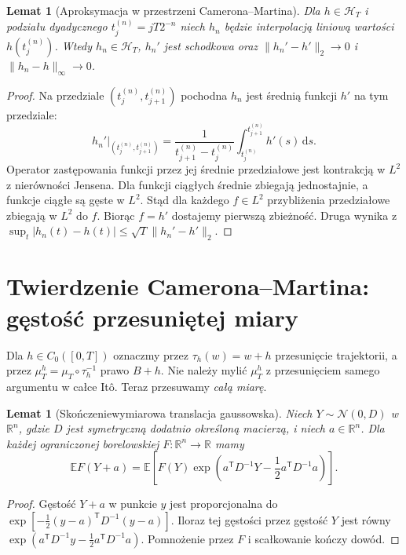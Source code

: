\documentclass[11pt,a4paper,oneside]{report}
\numberwithin{equation}{chapter}
\theoremstyle{plain}
\newtheorem{lemat}[twierdzenie]{Lemat}
\theoremstyle{definition}
\theoremstyle{remark}
\newcommand{\R}{\mathbb{R}}
\newcommand{\E}{\mathbb{E}}
\newcommand{\calH}{\mathcal{H}}
\newcommand{\dd}{\mathrm{d}}
\newcommand{\Normal}{\mathcal{N}}
\begin{document}
\begin{lemat}[Aproksymacja w przestrzeni Camerona--Martina]\label{lem:volIII:09:01}
\label{lem:cm-approx}
Dla $h\in\calH_T$ i podziału dyadycznego
$t_j^{(n)}=jT2^{-n}$ niech $h_n$ będzie interpolacją liniową
wartości $h(t_j^{(n)})$. Wtedy $h_n\in\calH_T$,
$h_n'$ jest schodkowa oraz
$\|h_n'-h'\|_2\to0$ i $\|h_n-h\|_\infty\to0$.
\end{lemat}
\begin{proof}
Na przedziale $(t_j^{(n)},t_{j+1}^{(n)})$ pochodna $h_n$
jest średnią funkcji $h'$ na tym przedziale:
\[
 h_n'|_{(t_j^{(n)},t_{j+1}^{(n)})}
 =\frac{1}{t_{j+1}^{(n)}-t_j^{(n)}}
 \int_{t_j^{(n)}}^{t_{j+1}^{(n)}}h'(s)\,\dd s.
\]
Operator zastępowania funkcji przez jej średnie przedziałowe
jest kontrakcją w $L^2$ z nierówności Jensena.
Dla funkcji ciągłych średnie zbiegają jednostajnie,
a funkcje ciągłe są gęste w $L^2$. Stąd dla każdego
$f\in L^2$ przybliżenia przedziałowe zbiegają w $L^2$ do $f$.
Biorąc $f=h'$ dostajemy pierwszą zbieżność. Druga wynika
z $\sup_t|h_n(t)-h(t)|\le\sqrt T\|h_n'-h'\|_2$.
\end{proof}

\section{Twierdzenie Camerona--Martina: gęstość przesuniętej miary}\label{sec:volIII:09:04}

Dla $h\in C_0([0,T])$ oznaczmy przez $\tau_h(w)=w+h$
przesunięcie trajektorii, a przez
$\mu_T^h=\mu_T\circ\tau_h^{-1}$ prawo $B+h$.
Nie należy mylić $\mu_T^h$ z przesunięciem samego argumentu
w całce Itô. Teraz przesuwamy \emph{całą miarę}.

\begin{lemat}[Skończeniewymiarowa translacja gaussowska]\label{lem:volIII:09:02}
\label{lem:gauss-shift}
Niech $Y\sim\Normal(0,D)$ w $\R^n$, gdzie $D$ jest
symetryczną dodatnio określoną macierzą, i niech
$a\in\R^n$. Dla każdej ograniczonej borelowskiej
$F:\R^n\to\R$ mamy
\[
\E F(Y+a)=\E\left[F(Y)\exp\left(
 a^{\mathsf T}D^{-1}Y-\frac12a^{\mathsf T}D^{-1}a
\right)\right].
\]
\end{lemat}
\begin{proof}
Gęstość $Y+a$ w punkcie $y$ jest proporcjonalna do
$\exp[-\frac12(y-a)^{\mathsf T}D^{-1}(y-a)]$.
Iloraz tej gęstości przez gęstość $Y$ jest równy
$\exp(a^{\mathsf T}D^{-1}y-\frac12a^{\mathsf T}D^{-1}a)$.
Pomnożenie przez $F$ i scałkowanie kończy dowód.
\end{proof}
\end{document}
